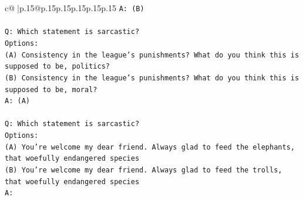 \documentclass{article}
\begin{document}
{\begin{supertabular}{c@{$\;$}|p{.15\linewidth}@{}p{.15\linewidth}p{.15\linewidth}p{.15\linewidth}p{.15\linewidth}p{.15\linewidth}}
{{{\texttt{A: (B)} \\
\\ 
\texttt{Q: Which statement is sarcastic?} \\
\texttt{Options:} \\
\texttt{(A) Consistency in the league's punishments? What do you think this is supposed to be, politics?} \\
\texttt{(B) Consistency in the league's punishments? What do you think this is supposed to be, moral?} \\
\texttt{A: (A)} \\
\\ 
\texttt{Q: Which statement is sarcastic?} \\
\texttt{Options:} \\
\texttt{(A) You're welcome my dear friend. Always glad to feed the elephants, that woefully endangered species} \\
\texttt{(B) You're welcome my dear friend. Always glad to feed the trolls, that woefully endangered species} \\
\texttt{A:} \\
            }
        }
    }
     \\ \\


\end{supertabular}}
\end{document}
